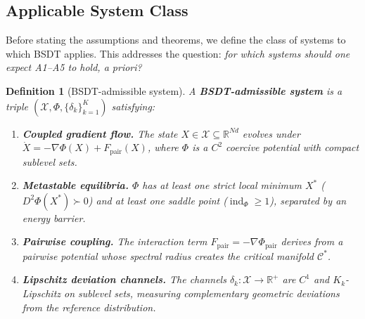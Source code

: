 \documentclass[11pt,a4paper]{article}
\newcommand{\R}{\mathbb{R}}
\newcommand{\Cman}{\mathcal{C}^*}
\newcommand{\Xst}{X^*}
\newcommand{\grad}{\nabla}
\DeclareMathOperator{\ind}{ind}
\newtheorem{definition}[theorem]{Definition}
\begin{document}
\subsection{Applicable System Class}\label{sec:system_class}

Before stating the assumptions and theorems, we define the class of
systems to which BSDT applies.  This addresses the question: \emph{for
which systems should one expect A1--A5 to hold, a priori?}

\begin{definition}[BSDT-admissible system]\label{def:admissible}
A \textbf{BSDT-admissible system} is a triple
$(\mathcal{X}, \Phi, \{\delta_k\}_{k=1}^K)$ satisfying:
\begin{enumerate}[nosep]
  \item \textbf{Coupled gradient flow.}  The state $X \in \mathcal{X}
    \subseteq \R^{Nd}$ evolves under $\dot{X} = -\grad\Phi(X) + F_{\mathrm{pair}}(X)$,
    where $\Phi$ is a $C^2$ coercive potential with compact sublevel sets.
  \item \textbf{Metastable equilibria.}  $\Phi$ has at least one strict
    local minimum $\Xst$ ($D^2\Phi(\Xst) \succ 0$) and at least one
    saddle point ($\ind_\Phi \ge 1$), separated by an energy barrier.
  \item \textbf{Pairwise coupling.}  The interaction term
    $F_{\mathrm{pair}} = -\grad\Phi_{\mathrm{pair}}$ derives from
    a pairwise potential whose spectral radius creates the critical
    manifold $\Cman$.
  \item \textbf{Lipschitz deviation channels.}  The channels
    $\delta_k: \mathcal{X} \to \R^+$ are $C^1$ and $K_k$-Lipschitz
    on sublevel sets, measuring complementary geometric deviations
    from the reference distribution.
\end{enumerate}
\end{definition}
\end{document}
